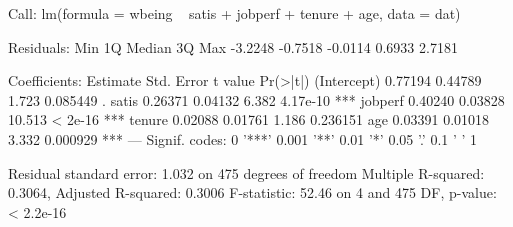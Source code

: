 \begin{Schunk}
\begin{Soutput}
Call:
lm(formula = wbeing ~ satis + jobperf + tenure + age, data = dat)

Residuals:
    Min      1Q  Median      3Q     Max 
-3.2248 -0.7518 -0.0114  0.6933  2.7181 

Coefficients:
            Estimate Std. Error t value Pr(>|t|)    
(Intercept)  0.77194    0.44789   1.723 0.085449 .  
satis        0.26371    0.04132   6.382 4.17e-10 ***
jobperf      0.40240    0.03828  10.513  < 2e-16 ***
tenure       0.02088    0.01761   1.186 0.236151    
age          0.03391    0.01018   3.332 0.000929 ***
---
Signif. codes:  0 '***' 0.001 '**' 0.01 '*' 0.05 '.' 0.1 ' ' 1

Residual standard error: 1.032 on 475 degrees of freedom
Multiple R-squared:  0.3064,	Adjusted R-squared:  0.3006 
F-statistic: 52.46 on 4 and 475 DF,  p-value: < 2.2e-16
\end{Soutput}
\end{Schunk}
